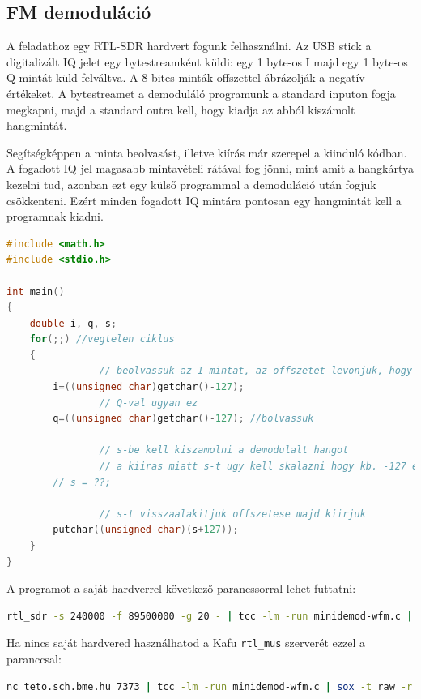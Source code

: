 \documentclass[12pt,a4paper]{article}
\begin{document}
\subsection{FM demoduláció}

A feladathoz egy RTL-SDR hardvert fogunk felhasználni.
Az USB stick a digitalizált IQ jelet egy bytestreamként küldi: egy 1 byte-os I majd egy 1 byte-os Q mintát küld felváltva.
A 8 bites minták offszettel ábrázolják a negatív értékeket.
A bytestreamet a demoduláló programunk a standard inputon fogja megkapni, majd a standard outra kell, hogy kiadja az abból kiszámolt hangmintát.

Segítségképpen a minta beolvasást, illetve kiírás már szerepel a kiinduló kódban.
A fogadott IQ jel magasabb mintavételi rátával fog jönni, mint amit a hangkártya kezelni tud, azonban ezt egy külső programmal a demoduláció után fogjuk csökkenteni.
Ezért minden fogadott IQ mintára pontosan egy hangmintát kell a programnak kiadni.

\begin{lstlisting}[frame=single,language=c,caption=Kiinduló kód]
#include <math.h>
#include <stdio.h>

int main()
{
	double i, q, s;
	for(;;) //vegtelen ciklus
	{
                // beolvassuk az I mintat, az offszetet levonjuk, hogy a 0 tenyleg 0 legyen
		i=((unsigned char)getchar()-127); 
                // Q-val ugyan ez
		q=((unsigned char)getchar()-127); //bolvassuk
	
                // s-be kell kiszamolni a demodulalt hangot
                // a kiiras miatt s-t ugy kell skalazni hogy kb. -127 es 128 koze essen.
		// s = ??;

                // s-t visszaalakitjuk offszetese majd kiirjuk
		putchar((unsigned char)(s+127));
	}
}
\end{lstlisting}

A programot a saját hardverrel következő parancssorral lehet futtatni:
\begin{lstlisting}[frame=single,language=bash]
 rtl_sdr -s 240000 -f 89500000 -g 20 - | tcc -lm -run minidemod-wfm.c | sox -t raw -r 240000 -e unsigned -b 8 -c 1 - -t raw - rate 48000 | aplay -f U8 -c1 -r 48000 --buffer-size=200000
\end{lstlisting}

Ha nincs saját hardvered használhatod a Kafu \texttt{rtl\_mus} szerverét ezzel a paranccsal:
\begin{lstlisting}[frame=single,language=bash]
nc teto.sch.bme.hu 7373 | tcc -lm -run minidemod-wfm.c | sox -t raw -r 240000 -e unsigned -b 8 -c 1 - -t raw - rate 48000 | aplay -f U8 -c1 -r 48000 --buffer-size=200000
\end{lstlisting}
\end{document}
